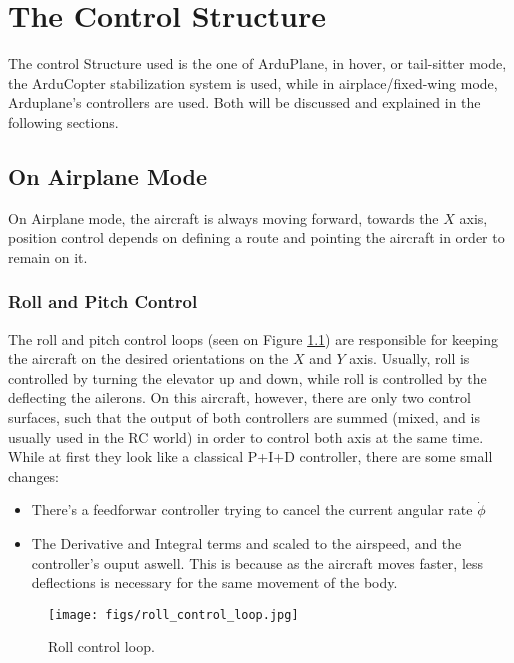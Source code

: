 \chapter{The Control Structure}

The control Structure used is the one of ArduPlane, in hover, or tail-sitter mode, the ArduCopter stabilization system is used, while in airplace/fixed-wing mode, Arduplane's controllers are used. Both will be discussed and explained in the following sections.

\section{On Airplane Mode}

On Airplane mode, the aircraft is always moving forward, towards the $X$ axis, position control depends on defining a route and pointing the aircraft in order to remain on it.

\subsection{Roll and Pitch Control}

The roll and pitch control loops (seen on Figure \ref{fig:roll_loop}) are responsible for keeping the aircraft on the desired orientations on the $X$ and $Y$ axis. Usually, roll is controlled by turning the elevator up and down, while roll is controlled by the deflecting the ailerons. On this aircraft, however, there are only two control surfaces, such that the output of both controllers are summed (mixed, and is usually used in the RC world) in order to control both axis at the same time.
While at first they look like a classical P+I+D controller, there are some small changes:

\begin{itemize}
\item There's a feedforwar controller trying to cancel the current angular rate $\dot{\phi}$
\item The Derivative and Integral terms and scaled to the airspeed, and the controller's ouput aswell. This is because  as the aircraft moves faster, less deflections is necessary for the same movement of the body.
\end{itemize}


\begin{figure}[H]
\centering
  \texttt{[image: figs/roll\_control\_loop.jpg]}
  \caption{Roll control loop.}
  \label{fig:roll_loop}
\end{figure}

